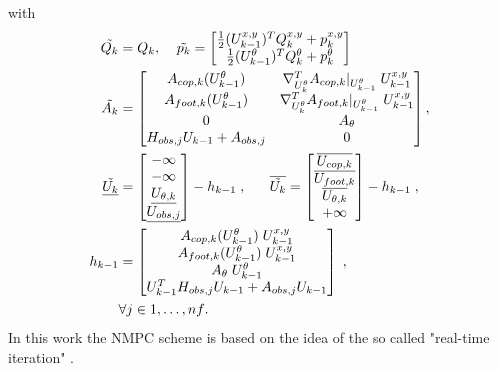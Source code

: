 with
\begin{align}
    \label{eq:problem_objective}
    \tilde{Q_k} &= Q_k
    ,\;\;\;\;
    \tilde{p_k} =
    \begin{bmatrix}
        \frac{1}{2} (U_{k-1}^{x,y})^T Q_k^{x,y}       + p_k^{x,y} \\
        \frac{1}{2} (U_{k-1}^{\theta})^T Q_k^{\theta} + p_k^{\theta}
    \end{bmatrix} \notag \\
    \tilde{A_k} &=
    \begin{bmatrix}
A_{cop,k}(U_{k-1}^\theta) &
\nabla_{U_{k}^{\theta}}^T A_{cop,k}|_{U_{k-1}^\theta} \; U_{k-1}^{x,y}\\
A_{foot,k}(U_{k-1}^\theta)&
\nabla_{U_{k}^{\theta}}^T A_{foot,k}|_{U_{k-1}^\theta} \; U_{k-1}^{x,y}\\
0 & A_{\theta} \\
H_{obs,j} U_{k-1} + A_{obs,j} &   0
    \end{bmatrix}, \notag
    \\
    \underline{\tilde{U_k}} &=
    \begin{bmatrix}
        -\infty \\
        -\infty \\
        \underline{U_{\theta,k}}\\
        \underline{U_{obs,j}}
    \end{bmatrix}
    - h_{k-1} \;,\;\;\;\;\;\;
    \overline{\tilde{U_k}} =
    \begin{bmatrix}
        \overline{U_{cop,k}} \\
        \overline{U_{foot,k}} \\
        \overline{U_{\theta,k}} \\
        +\infty
    \end{bmatrix}
    - h_{k-1} \;, \notag \\
    h_{k-1} &=
    \begin{bmatrix}
        A_{cop,k}(U_{k-1}^\theta) \; U_{k-1}^{x,y} \\
        A_{foot,k}(U_{k-1}^\theta) \; U_{k-1}^{x,y} \\
        A_{\theta} \; U_{k-1}^{\theta} \\
        U_{k-1}^T H_{obs,j} U_{k-1} + A_{obs,j} U_{k-1}
    \end{bmatrix} \; , \; \notag \\
    &\forall j \in {1, \hdots , nf} \notag
    .
\end{align}
In this work the NMPC scheme is based on the idea of the so called "real-time iteration" \cite{bock_numerical_2007,diehl_real-time_2002}.
